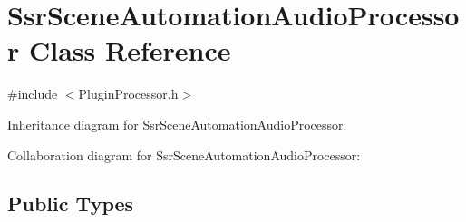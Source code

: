 \hypertarget{classSsrSceneAutomationAudioProcessor}{\section{Ssr\-Scene\-Automation\-Audio\-Processor Class Reference}
\label{classSsrSceneAutomationAudioProcessor}
}


{\ttfamily \#include $<$Plugin\-Processor.\-h$>$}



Inheritance diagram for Ssr\-Scene\-Automation\-Audio\-Processor\-:


Collaboration diagram for Ssr\-Scene\-Automation\-Audio\-Processor\-:
\subsection*{Public Types}
